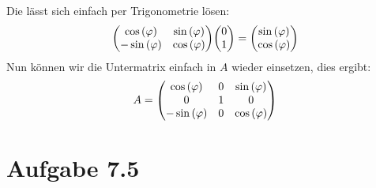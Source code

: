 \documentclass{theozettel}
\begin{document}
Die lässt sich einfach per Trigonometrie lösen:
\begin{align*}
\mqty(\cos\left(\varphi\right) & \sin\left(\varphi\right)\\ -\sin\left(\varphi\right) &\cos\left(\varphi\right))\mqty(0 \\ 1)=\mqty(\sin\left(\varphi\right)\\\cos\left(\varphi\right))
\end{align*}
Nun können wir die Untermatrix einfach in $A$ wieder einsetzen, dies ergibt:
\begin{align*}
A=\mqty(\cos\left(\varphi\right)&0&\sin\left(\varphi\right)\\0&1&0\\-\sin\left(\varphi\right)&0&\cos\left(\varphi\right))
\end{align*}
\section*{Aufgabe 7.5} 
\end{document}
